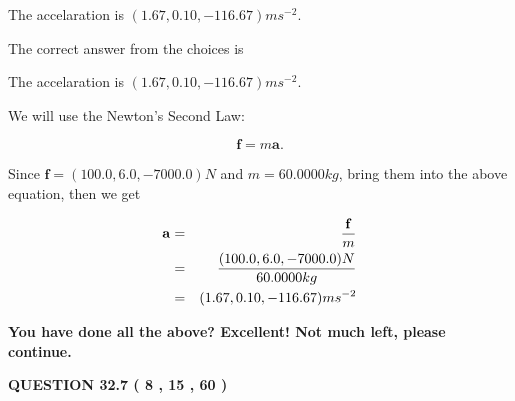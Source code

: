 \documentclass[12pt]{article}
\begin{document}
\noindent{}
 
 
The accelaration is $  %
(
1.67,
0.10,
-116.67)
ms^{-2} $.
 
 
 
 
 
 
\noindent{}

The correct answer from the choices is


The accelaration is $  %
(
1.67,
0.10,
-116.67)
ms^{-2} $.
 
 
 
 
 
\noindent{}

We will use the Newton's Second Law:
 
\[
\mathbf{f}=m\mathbf{a}.
\]
 
Since $\mathbf{f}= %
(100.0 , 6.0 , -7000.0) N$
and $m= %
60.0000kg$, bring them into the above equation, then we get
 
\begin{eqnarray*}
\mathbf{a}&=&\frac{\mathbf{f}}m  \\
&=&\frac{ %
(100.0 , 6.0 , -7000.0) N}{ %
60.0000kg}  \\
&=& %
(1.67 , 0.10 , -116.67) ms^{-2}
\end{eqnarray*}
 
 
 
   
   
\vspace{0.3in}
{\textbf{\LARGE{You have done all the above? Excellent! Not much left, please continue.}}}
\vspace{0.3in}
   
   
  
\vspace{0.2in}
  
{\textbf{\Large{QUESTION
32.7 
 (           8 ,          15 ,          60 )
}}}
  
  
 
 
\noindent{}
\end{document}
